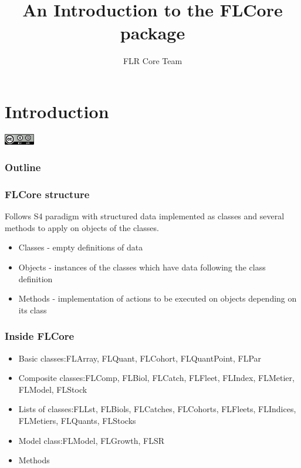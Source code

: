 \documentclass{beamer}%
\title[Introduction to FLCore]{An Introduction to the FLCore package}
\author{FLR Core Team}
\begin{document}
\section{Introduction}
\begin{frame}[plain]
\titlepage
\begin{flushright}
	\includegraphics[width=0.1\textwidth]{cc.png}
\end{flushright}
\end{frame}

\begin{frame}
\frametitle{Outline}
\tableofcontents[pausesections]
\end{frame}


\begin{frame}
\frametitle{FLCore structure}
Follows S4 paradigm with structured data implemented as classes and several methods to apply on objects of the classes.
	\begin{itemize}
		\item<2-> Classes - empty definitions of data
		\item<3-> Objects - instances of the classes which have data following the class definition
		\item<4-> Methods - implementation of actions to be executed on objects depending on its class
      \end{itemize}
\end{frame}

\begin{frame}
  \frametitle{Inside FLCore}
	\begin{itemize}
		\item<2-> Basic classes:\newline FLArray, FLQuant, FLCohort, FLQuantPoint, FLPar
		\item<3-> Composite classes:\newline FLComp, FLBiol, FLCatch, FLFleet, FLIndex, FLMetier, FLModel, FLStock
		\item<4-> Lists of classes:\newline FLLst, FLBiols, FLCatches, FLCohorts, FLFleets, FLIndices, FLMetiers, FLQuants, FLStocks 
		\item<5-> Model class:\newline FLModel, FLGrowth, FLSR
		\item<6-> Methods
	\end{itemize}
\end{frame}
\end{document}
